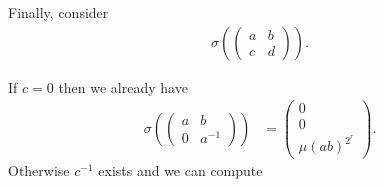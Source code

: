 	Finally, consider
	\begin{align*}
	\sigma\left(
			\left(\begin{matrix}a & b \\ c & d\end{matrix}\right)
			\right).
	\end{align*}

	If $c=0$ then we already have
	\begin{align*}
	\sigma\left(
			\left(\begin{matrix}a & b \\ 0 & a^{-1}\end{matrix}\right)
			\right)
	&=
	\left(\begin{matrix}0 \\ 0 \\ \mu(ab)^{2^r}\end{matrix}\right).
	\end{align*}
	Otherwise $c^{-1}$ exists and we can compute
